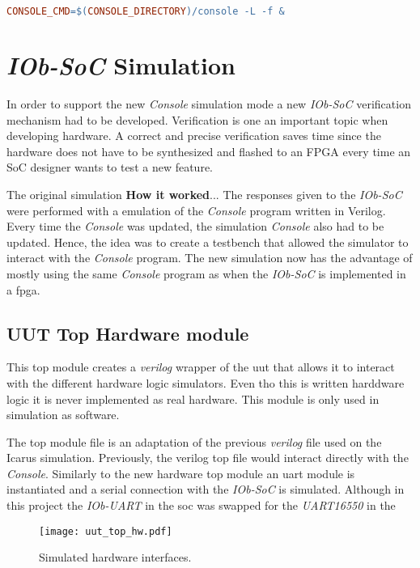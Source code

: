 \begin{lstlisting}[language=make, caption={Call \textit{Console} program}, label=lst:call_console]
    CONSOLE_CMD=$(CONSOLE_DIRECTORY)/console -L -f &
\end{lstlisting}

\section{\textit{IOb-SoC} Simulation}
\label{section:simulation}
In order to support the new \textit{Console} simulation mode a new \textit{IOb-SoC} verification mechanism had to be developed. Verification is one an important topic when developing hardware. A correct and precise verification saves time since the hardware does not have to be synthesized and flashed to an FPGA every time an SoC designer wants to test a new feature.

The original simulation \textbf{How it worked}... The responses given to the \textit{IOb-SoC} were performed with a emulation of the \textit{Console} program written in Verilog. Every time the \textit{Console} was updated, the simulation \textit{Console} also had to be updated. Hence, the idea was to create a testbench that allowed the simulator to interact with the \textit{Console} program. The new simulation now has the advantage of mostly using the same \textit{Console} program as when the \textit{IOb-SoC} is implemented in a \acrshort{fpga}.

\subsection{UUT Top Hardware module}
This top module creates a \textit{verilog} wrapper of the \acrfull{uut} that allows it to interact with the different hardware logic simulators. Even tho this is written harddware logic it is never implemented as real hardware. This module is only used in simulation as software.

The top module file is an adaptation of the previous \textit{verilog} file used on the Icarus simulation. Previously, the verilog top file would interact directly with the \textit{Console}. Similarly to the new hardware top module an \acrshort{uart} module is instantiated and a serial connection with the \textit{IOb-SoC} is simulated. Although in this project the \textit{IOb-UART} in the \acrfull{soc} was swapped for the \textit{UART16550} in the 

\begin{figure}[!ht]
    \centering
    \texttt{[image: uut\_top\_hw.pdf]}
    \caption{Simulated hardware interfaces.}
    \label{fig:uut_top_hw}
\end{figure}

